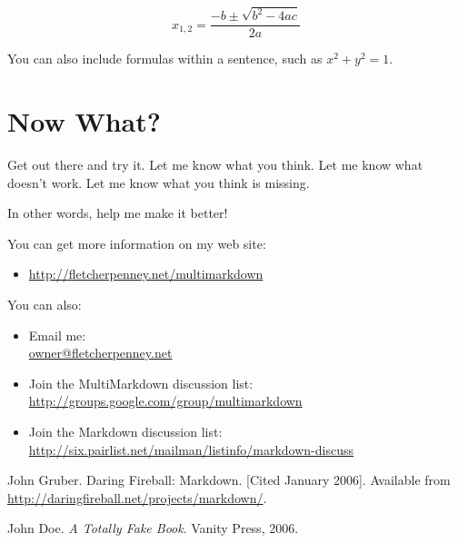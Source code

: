 \documentclass[oneside,article]{memoir}
\def\mybibliostyle{plain}
\def\bibliocommand{}
\begin{document}
\begin{equation}
\label{quadraticequationsolution}
{x}_{1,2}=\frac{-b\pm \sqrt{{b}^{2}-4ac}}{2a}
\end{equation}


You can also include formulas within a sentence, such as
${x}^{2}+{y}^{2}=1$.


\chapter{Now What?}
\label{nowwhat}

Get out there and try it. Let me know what you think. Let me know what doesn't
work. Let me know what you think is missing.


In other words, help me make it better!


You can get more information on my web site:


\begin{itemize}


\item \url{http://fletcherpenney.net/multimarkdown}
\end{itemize}

You can also:


\begin{itemize}


\item Email me: \\\href{mailto:owner@fletcherpenney.net}{owner@fletcherpenney.net}




\item Join the MultiMarkdown discussion list: \\\url{http://groups.google.com/group/multimarkdown}




\item Join the Markdown discussion list: \\\url{http://six.pairlist.net/mailman/listinfo/markdown-discuss}



\end{itemize}

\begin{thebibliography}{0}


John Gruber.  Daring Fireball: Markdown. [Cited January 2006]. Available from \url{http://daringfireball.net/projects/markdown/}.

John Doe. {\itshape A Totally Fake Book}.  Vanity Press, 2006.
		
\end{thebibliography}
		
%
%

\backmatter


\bibliocommand

\printglossary


\printindex
\end{document}

